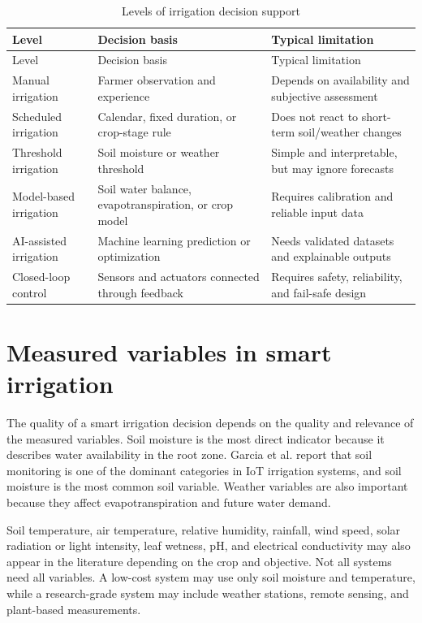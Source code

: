\begin{footnotesize}
\setlength{\tabcolsep}{2pt}
\begin{longtable}{@{}>{\raggedright\arraybackslash}p{}>{\raggedright\arraybackslash}p{}>{\raggedright\arraybackslash}p{}@{}}
\caption{Levels of irrigation decision support}\\
\toprule
Level & Decision basis & Typical limitation \\
\midrule
\endfirsthead
\toprule
Level & Decision basis & Typical limitation \\
\midrule
\endhead
Manual irrigation & Farmer observation and experience & Depends on availability and subjective assessment \\
Scheduled irrigation & Calendar, fixed duration, or crop-stage rule & Does not react to short-term soil/weather changes \\
Threshold irrigation & Soil moisture or weather threshold & Simple and interpretable, but may ignore forecasts \\
Model-based irrigation & Soil water balance, evapotranspiration, or crop model & Requires calibration and reliable input data \\
AI-assisted irrigation & Machine learning prediction or optimization & Needs validated datasets and explainable outputs \\
Closed-loop control & Sensors and actuators connected through feedback & Requires safety, reliability, and fail-safe design \\
\bottomrule
\end{longtable}
\end{footnotesize}

\section{Measured variables in smart irrigation}

The quality of a smart irrigation decision depends on the quality and relevance of the measured variables. Soil moisture is the most direct indicator because it describes water availability in the root zone. Garcia et al. \cite{garcia2020iotirrigation} report that soil monitoring is one of the dominant categories in IoT irrigation systems, and soil moisture is the most common soil variable. Weather variables are also important because they affect evapotranspiration and future water demand.

Soil temperature, air temperature, relative humidity, rainfall, wind speed, solar radiation or light intensity, leaf wetness, pH, and electrical conductivity may also appear in the literature depending on the crop and objective. Not all systems need all variables. A low-cost system may use only soil moisture and temperature, while a research-grade system may include weather stations, remote sensing, and plant-based measurements.


